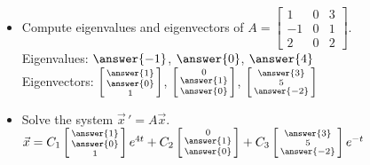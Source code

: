 \documentclass{ximera}
\begin{document}
\begin{exercise}%
    \begin{itemize}
        \item Compute eigenvalues and eigenvectors of
            $A= 
            \left[ 
                \begin{smallmatrix}
                    1 & 0 & 3 \\
                    -1 & 0 & 1 \\
                    2 & 0 & 2
                \end{smallmatrix}
            \right]$.\\
            Eigenvalues: $\answer{-1}$, $\answer{0}$, $\answer{4}$\\
            Eigenvectors:
            $\left[ \begin{smallmatrix}
                \answer{1} \\ \answer{0} \\ 1
            \end{smallmatrix}\right]$,
            $\left[ \begin{smallmatrix}
                0 \\ \answer{1} \\ \answer{0}
            \end{smallmatrix}\right]$,
            $\left[ \begin{smallmatrix}
                \answer{3} \\ 5 \\ \answer{-2}
            \end{smallmatrix}\right]$
        \item Solve the system $\vec{x}\,' = A \vec{x}$.\\
            $\vec{x} = C_1
            \left[ \begin{smallmatrix}
                \answer{1} \\ \answer{0} \\ 1
            \end{smallmatrix}\right] e^{4t}
            + C_2
            \left[ \begin{smallmatrix}
                0 \\ \answer{1} \\ \answer{0}
            \end{smallmatrix}\right] 
            + C_3
            \left[ \begin{smallmatrix}
                \answer{3} \\ 5 \\ \answer{-2}
            \end{smallmatrix}\right] e^{-t}$
    \end{itemize}
\end{exercise}
\end{document}
